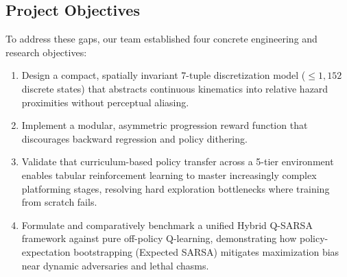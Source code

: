 \subsection{Project Objectives}
To address these gaps, our team established four concrete engineering and research objectives:
\begin{enumerate}
    \item Design a compact, spatially invariant 7-tuple discretization model ($\le 1{,}152$ discrete states) that abstracts continuous kinematics into relative hazard proximities without perceptual aliasing.
    \item Implement a modular, asymmetric progression reward function that discourages backward regression and policy dithering.
    \item Validate that curriculum-based policy transfer across a 5-tier environment enables tabular reinforcement learning to master increasingly complex platforming stages, resolving hard exploration bottlenecks where training from scratch fails.
    \item Formulate and comparatively benchmark a unified Hybrid Q-SARSA framework against pure off-policy Q-learning, demonstrating how policy-expectation bootstrapping (Expected SARSA) mitigates maximization bias near dynamic adversaries and lethal chasms.
\end{enumerate}

